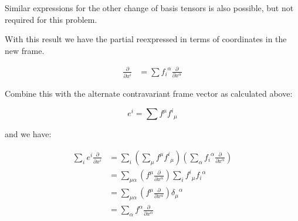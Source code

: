 \documentclass{article}      %
\begin{document}
Similar expressions for the other change of basis tensors is also possible, but
not required for this problem.

With this result we have the partial reexpressed in terms of coordinates
in the new frame.

\begin{align*}
\frac{\partial}{\partial x^i} &= \sum {f_i}^{\alpha} \frac{\partial}{\partial x^\alpha} 
\end{align*}

Combine this with the alternate contravariant frame vector as calculated above:

\[
e^i = \sum f^{\mu} {f^i}_{\mu}
\]

and we have:

\begin{align*}
\sum_i e^i \frac{\partial}{\partial x^i}
&= \sum_i \left(\sum_{\mu} f^{\mu} {f^i}_{\mu} \right) \left( \sum_{\alpha} {f_i}^{\alpha} \frac{\partial}{\partial x^\alpha}\right) \\
&= \sum_{\mu \alpha} \left(f^{\mu} \frac{\partial}{\partial x^\alpha} \right) \sum_i {f^i}_{\mu} {f_i}^{\alpha} \\
&= \sum_{\mu \alpha} \left(f^{\mu} \frac{\partial}{\partial x^\alpha} \right) {\delta_{\mu}}^{\alpha} \\
&= \sum_{\alpha} f^{\alpha} \frac{\partial}{\partial x^\alpha} \\
\end{align*}

\end{document}
